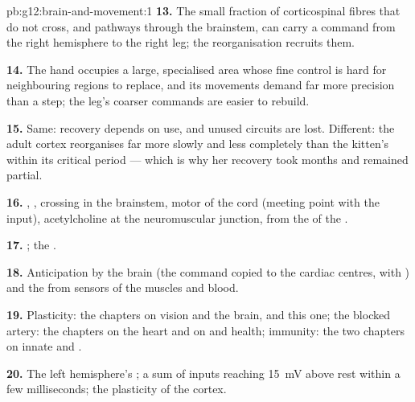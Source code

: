 \begin{solution}{pb:g12:brain-and-movement:1}
\textbf{13.} The small fraction of corticospinal fibres that do not
cross, and pathways through the brainstem, can carry a command from
the right hemisphere to the right leg; the reorganisation recruits
them.

\textbf{14.} The hand occupies a large, specialised area whose fine
control is hard for neighbouring regions to replace, and its movements
demand far more precision than a step; the leg's coarser commands are
easier to rebuild.

\textbf{15.} Same: recovery depends on use, and unused circuits are
lost. Different: the adult cortex reorganises far more slowly and less
completely than the kitten's within its critical period --- which is
why her recovery took months and remained partial.

\textbf{16.} , , crossing in the
brainstem, motor  of the cord (meeting point with the 
input), acetylcholine at the neuromuscular junction,  from the
 of the .

\textbf{17.} ; the .

\textbf{18.} Anticipation by the brain (the command copied to the
cardiac centres, with ) and the  from sensors of the
muscles and blood.

\textbf{19.} Plasticity: the chapters on vision and the brain, and
this one; the blocked artery: the chapters on the heart and on
 and health; immunity: the two chapters on innate and
.

\textbf{20.} The left hemisphere's ; a sum of
inputs reaching \qty{15}{mV} above rest within a few milliseconds;
the plasticity of the cortex.
\end{solution}
